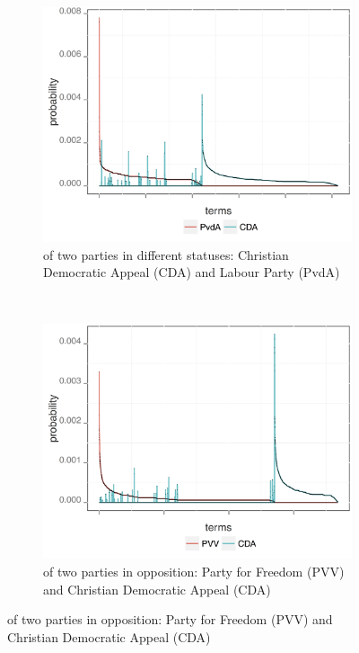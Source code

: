 \begin{figure}[!t]
        \centering
        \begin{subfigure}[b]{0.32\textwidth}
        
\includegraphics[width=\linewidth]{02-part-01/chapter-03/figs_and_tables/img_PvdA-CDA.png}
\caption{\label{fig:HSPCO} \achswlm of two parties in different statuses: Christian Democratic Appeal (CDA) and Labour Party (PvdA)}

        \end{subfigure}
        ~ 
        \begin{subfigure}[b]{0.32\textwidth}
           
\centering
\includegraphics[width=\linewidth]{02-part-01/chapter-03/figs_and_tables/img_PVV-CDA.png}
\caption{\label{fig:HSPOO} \achswlm of two parties in opposition: Party for Freedom (PVV) and Christian Democratic Appeal (CDA)}


\end{subfigure}
\end{figure}
